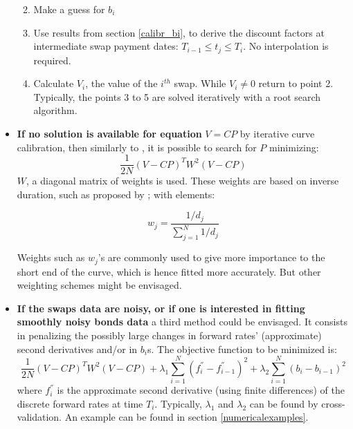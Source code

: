 \begin{itemize}
\begin{enumerate}
\medskip

\item Make a guess for $b_i$

\medskip

\item Use results from section \ref{calibr_bi}, to derive the discount factors at intermediate swap payment dates: $T_{i-1} \leq t_j \leq T_i$. No interpolation is required.

\medskip

\item Calculate $V_i$, the value of the $i^{th}$ swap. While $V_i \neq 0$ return to point 2. Typically, the points 3 to 5 are solved iteratively with a root search algorithm.
\end{enumerate}

\medskip

\item \textbf{If no solution is available for equation} $V = CP$ by iterative curve calibration, then similarly to \cite{andersen2007discount}, it is possible to search for $P$ minimizing:
\begin{equation}
\label{problem2}
\frac{1}{2N}\left(V - CP\right)^T W^2 \left(V - CP\right)
\end{equation}
$W$, a diagonal matrix of weights is used. These weights are based on inverse duration, such as proposed by \cite{bliss1997}; with elements:

\begin{equation}
w_j = \frac{1/d_j}{\sum_{j = 1}^N 1/d_j}
\end{equation}

Weights such as $w_j$'s are commonly used to give more importance to the short end of the curve, which is hence fitted more accurately. But other weighting schemes might be envisaged.

\medskip


\item \textbf{If the swaps data are noisy, or if one is interested in fitting smoothly noisy bonds data} a third method could be envisaged. It consists in penalizing the possibly large changes in forward rates' (approximate) second derivatives and/or in $b_i$s. The objective function to be minimized is:
\begin{equation}
\label{problem3}
\frac{1}{2N}\left(V - CP\right)^T W^2 \left(V - CP\right) + \lambda_1 \sum_{i = 1}^N(f_i^{''} - f_{i-1}^{''})^2 + \lambda_2 \sum_{i = 1}^N(b_i - b_{i-1})^2
\end{equation}
where $f_i^{''}$ is the approximate second derivative (using finite differences) of the discrete forward rates at time $T_i$. Typically, $\lambda_1$ and $\lambda_2$ can be found by cross-validation. An example can be found in section \ref{numericalexamples}.

\end{itemize}


